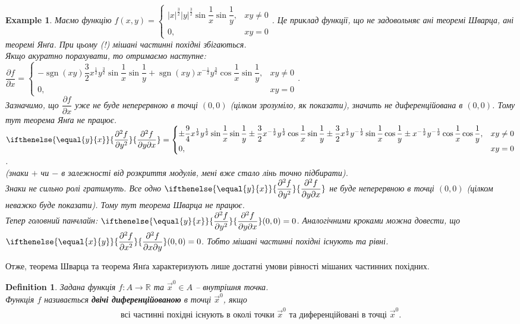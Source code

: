 \documentclass[a4paper, 10pt]{article}
\def\departial#1#2{\dfrac{\partial {#1}}{\partial {#2}}}
\def\seconddepartial#1#2#3{\ifthenelse{\equal{#2}{#3}}{\dfrac{\partial^2 {#1}}{\partial {#2}^2}}{\dfrac{\partial^2 {#1}}{\partial {#2} \partial {#3}}}}
\theoremstyle{theoremdd}
\theoremstyle{theoremdd}
\theoremstyle{theoremdd}
\newtheorem{definition}[theorem]{Definition}
\theoremstyle{theoremdd}
\theoremstyle{theoremdd}
\newtheorem{example}[theorem]{Example}
\theoremstyle{theoremdd}
\theoremstyle{theoremdd}
\theoremstyle{theoremdd}
\theoremstyle{theoremdd}
\DeclareMathOperator{\sgn}{sgn}
\begin{document}
\begin{example}
Маємо функцію $f(x,y) = \begin{cases} |x|^{\frac{3}{2}} |y|^{\frac{3}{2}} \sin \dfrac{1}{x} \sin \dfrac{1}{y}, & xy \neq 0 \\ 0, & xy = 0 \end{cases}$. Це приклад функції, що не задовольняє ані теоремі Шварца, ані теоремі Янґа. При цьому (!) мішані частинні похідні збігаються.\\
Якщо акуратно порахувати, то отримаємо наступне:\\
$\departial{f}{x} = \begin{cases} -\sgn (xy) \dfrac{3}{2} x^{\frac{1}{2}} y^{\frac{3}{2}} \sin \dfrac{1}{x}\sin \dfrac{1}{y} + \sgn(xy) x^{-\frac{1}{2}} y^{\frac{3}{2}} \cos \dfrac{1}{x} \sin \dfrac{1}{y}, & xy \neq 0 \\ 0, & xy = 0 \end{cases}$.\\
Зазначимо, що $\departial{f}{x}$ уже не буде неперервною в точці $(0,0)$ (цілком зрозуміло, як показати), значить не диференційована в $(0,0)$. Тому тут теорема Янґа не працює.\\
$\seconddepartial{f}{y}{x} = \begin{cases} \pm \dfrac{9}{4} x^{\frac{1}{2}} y^{\frac{1}{2}} \sin \dfrac{1}{x} \sin \dfrac{1}{y} \pm \dfrac{3}{2} x^{-\frac{1}{2}} y^{\frac{1}{2}} \cos \dfrac{1}{x} \sin \dfrac{1}{y} \pm \dfrac{3}{2} x^{\frac{1}{2}} y^{-\frac{1}{2}} \sin \dfrac{1}{x} \cos \dfrac{1}{y} \pm x^{-\frac{1}{2}} y^{-\frac{1}{2}} \cos \dfrac{1}{x} \cos \dfrac{1}{y}, & xy \neq 0 \\ 0, & xy = 0 \end{cases}$.\\
(знаки $+$ чи $-$ в залежності від розкриття модулів, мені вже стало лінь точно підбирати).\\
Знаки не сильно ролі гратимуть. Все одно $\seconddepartial{f}{y}{x}$ не буде неперервною в точці $(0,0)$ (цілком неважко буде показати). Тому тут теорема Шварца не працює.\\
Тепер головний панчлайн: $\seconddepartial{f}{y}{x}(0,0) = 0$. Аналогічними кроками можна довести, що $\seconddepartial{f}{x}{y}(0,0) = 0$. Тобто мішані частинні похідні існують та рівні.
\end{example}
\noindent
Отже, теорема Шварца та теорема Янґа характеризують лише достатні умови рівності мішаних частинних похідних.

\begin{definition}
Задана функція $f\colon A \to \mathbb{R}$ та $\vec{x}^0 \in A$ -- внутрішня точка.\\
Функція $f$ називається \textbf{двічі диференційованою} в точці $\vec{x}^0$, якщо
\begin{align*}
\text{всі частинні похідні існують в околі точки $\vec{x}^0$ та диференційовані в точці $\vec{x}^0$.}
\end{align*}
\end{definition}
\end{document}
